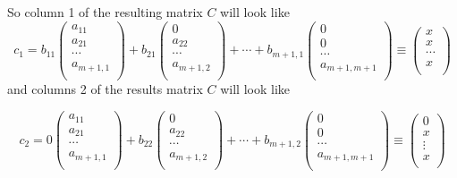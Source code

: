 \documentclass[12pt,a4paper,twoside]{article}
\begin{document}
So column 1 of the resulting matrix $C$ will look like
\begin{equation}
c_1=
b_{11}\begin{pmatrix}
a_{11}\\
a_{21}\\
\cdots\\
a_{m+1,1}\\
\end{pmatrix}+b_{21}
\begin{pmatrix}
0\\
a_{22}\\
\cdots \\
a_{m+1,2}\\
\end{pmatrix}+\cdots+b_{m+1,1}
\begin{pmatrix}
0 \\
0 \\
\cdots \\
a_{m+1,m+1}\\
\end{pmatrix} \equiv
\begin{pmatrix}
x \\
x \\
\cdots \\
x\\
\end{pmatrix}
\end{equation}
and columns 2 of the results matrix $C$ will look like

\begin{equation}
c_2=
0 \begin{pmatrix}
a_{11}\\
a_{21}\\
\cdots\\
a_{m+1,1}\\
\end{pmatrix}+b_{22}
\begin{pmatrix}
0\\
a_{22}\\
\cdots \\
a_{m+1,2}\\
\end{pmatrix}+\cdots+b_{m+1,2}
\begin{pmatrix}
0 \\
0 \\
\cdots \\
a_{m+1,m+1}\\
\end{pmatrix} \equiv
\begin{pmatrix}
0 \\
x \\
\vdots \\
x \\
\end{pmatrix}
\end{equation}
\end{document}
